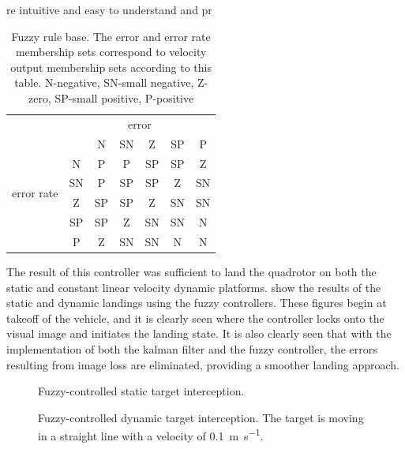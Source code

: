 \begin{table}[ht]
    \centering
    \caption{Fuzzy rule base. The error and error rate membership sets correspond to velocity output
    membership sets according to this table. N-negative, SN-small negative, Z-zero, SP-small positive,
P-positive}re intuitive and easy to understand and pr\label{t:rules}
    \begin{tabular}{cc||c|c|c|c|c|}
        &  \multicolumn{6}{c}{error}  \\ 	
        \multirow{6}{*}{error rate} &    & N  & SN & Z  & SP & P  \\ 	\hhline{~=#=|=|=|=|=|}
                                    & N  & P  & P  & SP & SP & Z  \\ 	\cline{2-7}
                                    & SN & P  & SP & SP & Z  & SN \\ 	\cline{2-7}
                                    & Z  & SP & SP & Z  & SN & SN \\ 	\cline{2-7}
                                    & SP & SP & Z  & SN & SN & N  \\ 	\cline{2-7}
                                    & P  & Z  & SN & SN & N  & N  \\ 	\cline{2-7}
    \end{tabular}
\end{table}



The result of this controller was sufficient to land the quadrotor on both the static and
constant linear velocity dynamic platforms.  show the results of the static
and dynamic landings using the fuzzy controllers. These figures begin at takeoff of the vehicle, and it is
clearly seen where the controller locks onto the visual image and initiates the landing state. It is also
clearly seen that with the implementation of both the kalman filter and the fuzzy controller, the errors
resulting from image loss are eliminated, providing a smoother landing approach.

\begin{figure}
    \centering
    
    \caption{Fuzzy-controlled static target interception.}\label{f:fuz_stat}
\end{figure}

\begin{figure}
    \centering
    
    \caption{Fuzzy-controlled dynamic target interception. The target is moving in a straight line with a
    velocity of \SI{0.1}{\meter\per\second}.}\label{f:fuz_dyn}
\end{figure}


